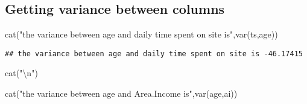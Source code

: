 \documentclass[
]{article}
\newenvironment{Shaded}{\begin{snugshade}}{\end{snugshade}}
\newcommand{\CommentTok}[1]{\textcolor[rgb]{0.56,0.35,0.01}{\textit{#1}}}
\newcommand{\FunctionTok}[1]{\textcolor[rgb]{0.00,0.00,0.00}{#1}}
\newcommand{\NormalTok}[1]{#1}
\newcommand{\OtherTok}[1]{\textcolor[rgb]{0.56,0.35,0.01}{#1}}
\newcommand{\SpecialCharTok}[1]{\textcolor[rgb]{0.00,0.00,0.00}{#1}}
\newcommand{\StringTok}[1]{\textcolor[rgb]{0.31,0.60,0.02}{#1}}
\begin{document}
\begin{Shaded}
\end{Shaded}

\hypertarget{getting-variance-between-columns}{%
\subsection{Getting variance between
columns}\label{getting-variance-between-columns}}

\begin{Shaded}
\begin{Highlighting}[]
\FunctionTok{cat}\NormalTok{(}\StringTok{"the variance between age and daily time spent on site is"}\NormalTok{,}\FunctionTok{var}\NormalTok{(ts,age))}
\end{Highlighting}
\end{Shaded}

\begin{verbatim}
## the variance between age and daily time spent on site is -46.17415
\end{verbatim}

\begin{Shaded}
\begin{Highlighting}[]
\FunctionTok{cat}\NormalTok{(}\StringTok{"}\SpecialCharTok{\textbackslash{}n}\StringTok{"}\NormalTok{)}
\end{Highlighting}
\end{Shaded}

\begin{Shaded}
\begin{Highlighting}[]
\FunctionTok{cat}\NormalTok{(}\StringTok{"the variance between age and Area.Income is"}\NormalTok{,}\FunctionTok{var}\NormalTok{(age,ai))}
\end{Highlighting}
\end{Shaded}
\end{document}
